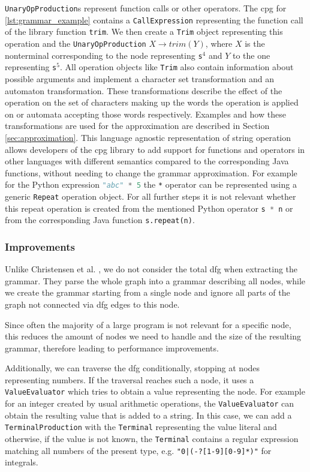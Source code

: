 \lstinline|UnaryOpProduction|s represent function calls or other operators. The \ac{cpg} for \ref{lst:grammar_example} contains a \lstinline|CallExpression| representing the function call of the library function \lstinline|trim|. We then create a \lstinline|Trim| object representing this operation and the \lstinline|UnaryOpProduction| $X \rightarrow trim(Y)$, where $X$ is the nonterminal corresponding to the node representing \lstinline|s|$^4$ and $Y$ to the one representing \lstinline|s|$^5$. 
All operation objects like \lstinline|Trim| also contain information about possible arguments and implement a character set transformation and an automaton transformation. These transformations describe the effect of the operation on the set of characters making up the words the operation is applied on or automata accepting those words respectively.
Examples and how these transformations are used for the approximation are described in Section \ref{sec:approximation}.
This language agnostic representation of string operation allows developers of the \ac{cpg} library to add support for functions and operators in other languages with different semantics compared to the corresponding Java functions, without needing to change the grammar approximation. For example for the Python expression \lstinline[language=Python]|"abc" * 5| the \lstinline|*| operator can be represented using a generic \lstinline|Repeat| operation object. For all further steps it is not relevant whether this repeat operation is created from the mentioned Python operator \lstinline[language=Python]|s * n| or from the corresponding Java function \lstinline|s.repeat(n)|. 


\subsubsection{Improvements}

Unlike Christensen et al. \cite{brics}, we do not consider the total \ac{dfg} when extracting the grammar. They parse the whole graph into a grammar describing all nodes, while we create the grammar starting from a single node and ignore all parts of the graph not connected via \ac{dfg} edges to this node.

Since often the majority of a large program is not relevant for a specific node, this reduces the amount of nodes we need to handle and the size of the resulting grammar, therefore leading to performance improvements.

Additionally, we can traverse the \ac{dfg} conditionally, stopping at nodes representing numbers. If the traversal reaches such a node, it uses a \lstinline|ValueEvaluator| which tries to obtain a value representing the node.
For example for an integer created by usual arithmetic operations, the \lstinline|ValueEvaluator| can obtain the resulting value that is added to a string.
In this case, we can add a \lstinline|TerminalProduction| with the \lstinline|Terminal| representing the value literal and otherwise, if the value is not known, the \lstinline|Terminal| contains a regular expression matching all numbers of the present type, e.g. \lstinline{"0|(-?[1-9][0-9]*)"} for integrals.
	

